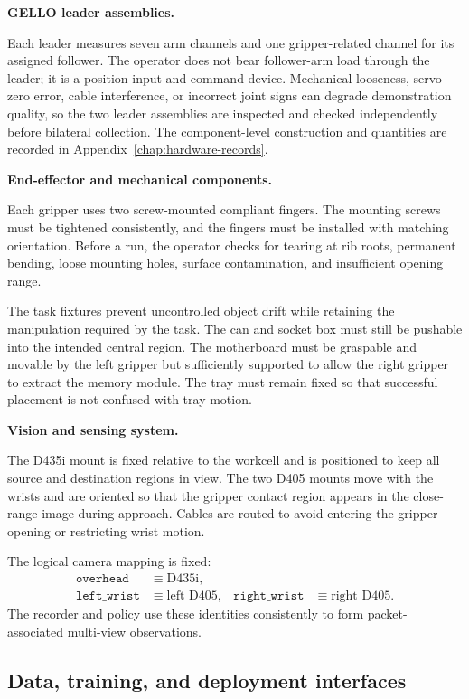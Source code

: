 \medskip
\noindent\textbf{GELLO leader assemblies.}

Each leader measures seven arm channels and one gripper-related channel for its assigned follower. The operator does not bear follower-arm load through the leader; it is a position-input and command device. Mechanical looseness, servo zero error, cable interference, or incorrect joint signs can degrade demonstration quality, so the two leader assemblies are inspected and checked independently before bilateral collection. The component-level construction and quantities are recorded in Appendix~\ref{chap:hardware-records}.

\medskip
\noindent\textbf{End-effector and mechanical components.}

Each gripper uses two screw-mounted compliant fingers. The mounting screws must be tightened consistently, and the fingers must be installed with matching orientation. Before a run, the operator checks for tearing at rib roots, permanent bending, loose mounting holes, surface contamination, and insufficient opening range.

The task fixtures prevent uncontrolled object drift while retaining the manipulation required by the task. The can and socket box must still be pushable into the intended central region. The motherboard must be graspable and movable by the left gripper but sufficiently supported to allow the right gripper to extract the memory module. The tray must remain fixed so that successful placement is not confused with tray motion.

\medskip
\noindent\textbf{Vision and sensing system.}

The D435i mount is fixed relative to the workcell and is positioned to keep all source and destination regions in view. The two D405 mounts move with the wrists and are oriented so that the gripper contact region appears in the close-range image during approach. Cables are routed to avoid entering the gripper opening or restricting wrist motion.

The logical camera mapping is fixed:
\begin{align*}
\texttt{overhead}&\equiv\text{D435i},\\
\texttt{left\_wrist}&\equiv\text{left D405},&
\texttt{right\_wrist}&\equiv\text{right D405}.
\end{align*}
The recorder and policy use these identities consistently to form packet-associated multi-view observations.

\subsection{Data, training, and deployment interfaces}

